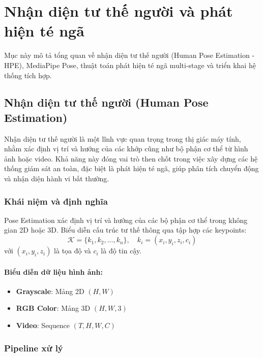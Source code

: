 
\section{Nhận diện tư thế người và phát hiện té ngã}
\label{sec:pose_fall_system}

Mục này mô tả tổng quan về nhận diện tư thế người (Human Pose Estimation - HPE), MediaPipe Pose, thuật toán phát hiện té ngã multi-stage và triển khai hệ thống tích hợp.

\subsection{Nhận diện tư thế người (Human Pose Estimation)}

Nhận diện tư thế người là một lĩnh vực quan trọng trong thị giác máy tính, nhằm xác định vị trí và hướng của các khớp cũng như bộ phận cơ thể từ hình ảnh hoặc video. Khả năng này đóng vai trò then chốt trong việc xây dựng các hệ thống giám sát an toàn, đặc biệt là phát hiện té ngã, giúp phân tích chuyển động và nhận diện hành vi bất thường.

\subsubsection{Khái niệm và định nghĩa}

Pose Estimation xác định vị trí và hướng của các bộ phận cơ thể trong không gian 2D hoặc 3D. Biểu diễn cấu trúc tư thế thông qua tập hợp các keypoints:
\begin{equation}
\mathcal{K} = \{k_1, k_2, ..., k_n\}, \quad k_i = (x_i, y_i, z_i, c_i)
\end{equation}
với $(x_i, y_i, z_i)$ là tọa độ và $c_i$ là độ tin cậy.

\paragraph{Biểu diễn dữ liệu hình ảnh:}
\begin{itemize}
    \item \textbf{Grayscale}: Mảng 2D $(H, W)$
    \item \textbf{RGB Color}: Mảng 3D $(H, W, 3)$
    \item \textbf{Video}: Sequence $(T, H, W, C)$
\end{itemize}

\subsubsection{Pipeline xử lý}

